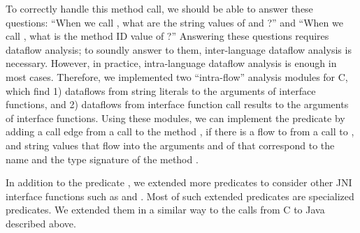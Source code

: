 To correctly handle this method call, we should be able to answer these
questions: ``When we call ,
what are the string values of  and ?'' and
``When we call , what is the method ID value of ?''
Answering these questions requires dataflow analysis;
to soundly answer to them, inter-language dataflow analysis is necessary.
However, in practice, intra-language dataflow analysis is enough in most cases.
Therefore, we implemented two ``intra-flow'' analysis modules for C,
which find 1) dataflows from string literals to the arguments of interface functions,
and 2) dataflows from interface function call results to the arguments of interface functions.
Using these modules, we can implement the
predicate  by adding a call edge from a 
call to the method , if there is a flow to  from a
call to , and string values that flow into the
arguments  and  of  that
correspond to the name and the type signature of the method .

In addition to the predicate ,
we extended more predicates to consider other JNI interface functions such as
 and .
Most of such extended predicates are specialized  predicates.
We extended them in a similar way to the calls from C to Java described above.
